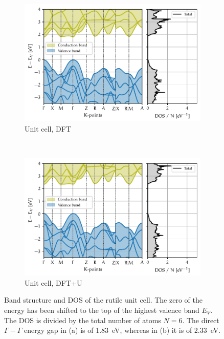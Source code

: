 \begin{figure}
    \centering
    \begin{subfigure}[t]{\textwidth}
        \centering
        \includegraphics[width=\textwidth]{figures/unit.pdf}
        \caption{Unit cell, DFT}
        \label{fig:bands_unit_dft}
    \end{subfigure}
    \\
    \begin{subfigure}[t]{\textwidth}
        \centering
        \includegraphics[width=\textwidth]{figures/unit+u.pdf}     \caption{Unit cell, DFT+U}
        \label{fig:bands_unit_dft+u}
    \end{subfigure}
    \caption[Band structure and DOS of the rutile unit cell]{Band structure and DOS of the rutile unit cell. The zero of the energy has been shifted to the top of the highest valence band $E_V$. The DOS is divided by the total number of atoms $N = 6$. The direct $\Gamma - \Gamma$ energy gap in (a) is of \SI{1.83}{eV}, whereas in (b) it is of \SI{2.33}{eV}.}
    \label{fig:bands_unit}
\end{figure}

